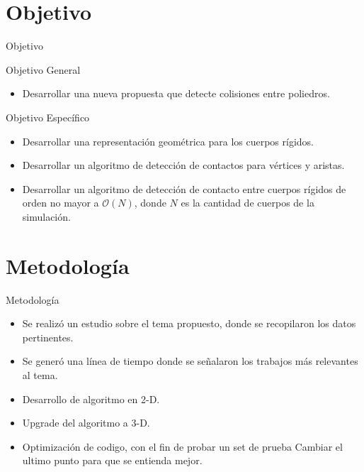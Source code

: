 \documentclass[11pt]{beamer}
\begin{document}
\section{Objetivo}
\begin{frame}{Objetivo}

\begin{block}{Objetivo General}
 \begin{itemize}
    \item Desarrollar una nueva propuesta que detecte colisiones entre poliedros.
 \end{itemize}
\end{block}

\begin{block}{Objetivo Específico}
 \begin{itemize}
    \item Desarrollar una representación geométrica para los cuerpos rígidos.
    \item Desarrollar un algoritmo de detección de contactos para vértices y aristas.
    \item Desarrollar un algoritmo de detección de contacto entre cuerpos rígidos de orden no mayor a $\mathcal{O}(N)$, donde $N$ es la cantidad de cuerpos de la simulación.
 \end{itemize}
\end{block}
\end{frame}     

\section{Metodología}
\begin{frame}{Metodología}
\begin{itemize}
    \item Se realizó un estudio sobre el tema propuesto, donde se recopilaron los datos pertinentes.
    \item Se generó una línea de tiempo donde se señalaron los trabajos más relevantes al tema.
    \item Desarrollo de algoritmo en 2-D.
    \item Upgrade del algoritmo a 3-D.
    \item Optimización de codigo, con el fin de probar un set de prueba
    \color{red} Cambiar el ultimo punto para que se entienda mejor.
\end{itemize}
\end{frame}
\end{document}
